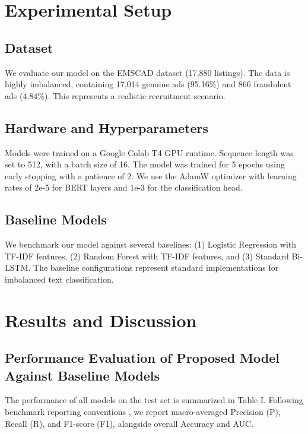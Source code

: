 \documentclass[conference]{IEEEtran}
\begin{document}
\section{Experimental Setup}

\subsection{Dataset}
We evaluate our model on the EMSCAD dataset (17,880 listings). The data is highly imbalanced, containing 17,014 genuine ads (95.16\%) and 866 fraudulent ads (4.84\%). This represents a realistic recruitment scenario.

\subsection{Hardware and Hyperparameters}
Models were trained on a Google Colab T4 GPU runtime. Sequence length was set to 512, with a batch size of 16. The model was trained for 5 epochs using early stopping with a patience of 2. We use the AdamW optimizer with learning rates of 2e-5 for BERT layers and 1e-3 for the classification head.

\subsection{Baseline Models}
We benchmark our model against several baselines: (1) Logistic Regression with TF-IDF features, (2) Random Forest with TF-IDF features, and (3) Standard Bi-LSTM. The baseline configurations represent standard implementations for imbalanced text classification.

\section{Results and Discussion}

\subsection{Performance Evaluation of Proposed Model Against Baseline Models}
The performance of all models on the test set is summarized in Table I. Following benchmark reporting conventions \cite{taneja2025fraud}, we report macro-averaged Precision (P), Recall (R), and F1-score (F1), alongside overall Accuracy and AUC.
\end{document}
